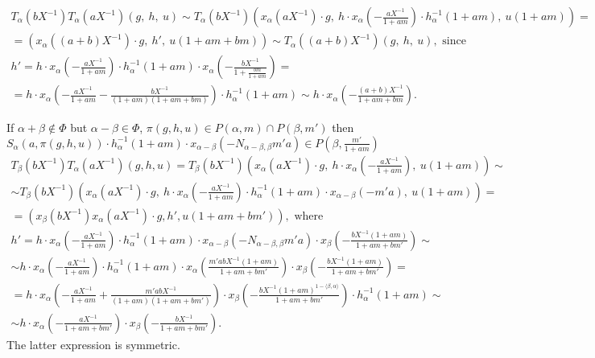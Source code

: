 \documentclass[oneside, 8pt]{amsart}
\theoremstyle{remark}
\theoremstyle{definition}
\numberwithin{equation}{section}
\begin{document}
\begin{multline}
 T_\alpha(bX^{-1}) T_\alpha(aX^{-1}) \left(g,\ h,\ u\right) \sim
T_\alpha(bX^{-1}) \left(x_\alpha(aX^{-1})\cdot g,\ h \cdot x_\alpha\left(-\frac{aX^{-1}}{1 + am}\right) \cdot h^{-1}_\alpha(1 + am),\ u(1 + am)\right) = \\
 = \left( x_\alpha\left((a+b)X^{-1}\right)\cdot g,\ h',\ u(1 + am + bm) \right) \sim T_\alpha((a+b)X^{-1}) \left( g,\ h,\ u\right),\text{ since} \end{multline} 
 \begin{multline}
h' = h \cdot x_\alpha\left(-\frac{aX^{-1}}{1+am}\right) \cdot h^{-1}_\alpha(1+am) \cdot x_\alpha\left(-\frac{bX^{-1}}{1 + \frac{bm}{1+am}}\right) = \\ = 
 h \cdot x_\alpha\left(- \frac{aX^{-1}}{1 + am} - \frac{bX^{-1}}{(1+am)(1 + am + bm)}\right) \cdot h^{-1}_\alpha(1+am) \sim  
  h \cdot x_\alpha\left(- \frac{(a+b)X^{-1}}{1 + am + bm}\right).
\end{multline}

If $\alpha + \beta \not \in \Phi$ but $\alpha - \beta \in \Phi$, $\pi(g, h, u) \in P(\alpha, m) \cap P(\beta, m')$ then
$S_\alpha(a, \pi(g, h, u))\cdot  h^{-1}_\alpha(1 + am) \cdot x_{\alpha-\beta}(-N_{\alpha-\beta, \beta}m'a) \in P(\beta, \frac{m'}{1 + am})$
\begin{multline}
 T_\beta(bX^{-1}) T_\alpha(aX^{-1}) \left(g, h, u\right) = 
 T_\beta(bX^{-1}) \left(x_\alpha(aX^{-1})\cdot g,\ h \cdot x_\alpha\left(-\frac{aX^{-1}}{1 + am}\right) ,\ u(1 + am)\right) \sim \\ 
 \sim T_\beta(bX^{-1}) \left(x_\alpha(aX^{-1})\cdot g,\ h \cdot x_\alpha\left(-\frac{aX^{-1}}{1 + am}\right) \cdot h^{-1}_\alpha(1 + am) \cdot x_{\alpha-\beta}(-m'a),\ u(1 + am)\right) = \\
 = (x_\beta(bX^{-1}) x_\alpha(aX^{-1}) \cdot g, h', u(1 + am + bm')), \text{ where} \end{multline} 
 \begin{multline}
 h' = h \cdot x_\alpha\left(-\frac{aX^{-1}}{1 + am}\right) \cdot h^{-1}_\alpha(1 + am) \cdot x_{\alpha-\beta}(-N_{\alpha-\beta, \beta}m'a) \cdot x_\beta\left(-\frac{bX^{-1}(1+am)}{1 + am + bm'}\right) \sim \\
    \sim h \cdot x_\alpha\left(-\frac{aX^{-1}}{1 + am}\right) \cdot h^{-1}_\alpha(1 + am) \cdot x_{\alpha}\left(\frac{m'abX^{-1}(1+am)}{1 + am + bm'}\right) \cdot x_\beta\left(-\frac{bX^{-1}(1+am)}{1 + am + bm'}\right) = \\
 = h \cdot x_\alpha\left(-\frac{aX^{-1}}{1 + am} + \frac{m'abX^{-1}}{(1+am)(1 + am + bm')}\right) \cdot x_\beta\left(-\frac{bX^{-1}(1+am)^{1 -\langle \beta, \alpha \rangle}}{1 + am + bm'}\right) \cdot h^{-1}_\alpha(1 + am) \sim \\
 \sim h \cdot x_\alpha\left(-\frac{aX^{-1}}{1 + am + bm'}\right) \cdot x_\beta\left(-\frac{bX^{-1}}{1 + am + bm'}\right).
\end{multline}
The latter expression is symmetric.
\end{document}
